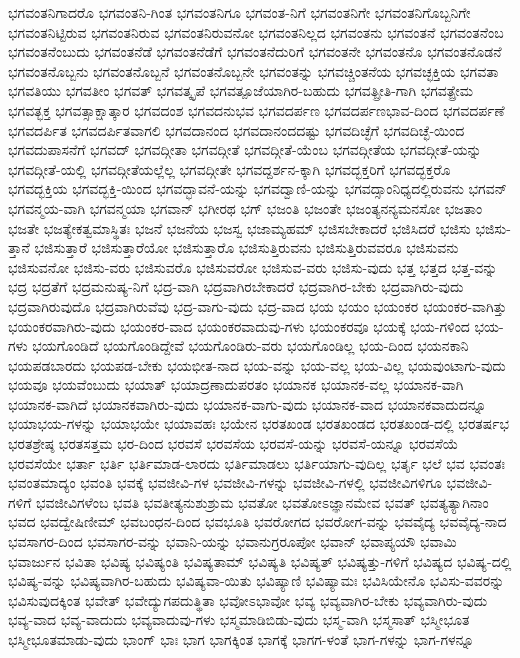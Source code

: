 {ಭಗವಂತನಿಗಾದರೊ
ಭಗವಂತನಿ-ಗಿಂತ
ಭಗವಂತನಿಗೂ
ಭಗವಂತ-ನಿಗೆ
ಭಗವಂತನಿಗೇ
ಭಗವಂತನಿಗೊಬ್ಬನಿಗೇ
ಭಗವಂತನಿಟ್ಟಿರುವ
ಭಗವಂತನಿರುವ
ಭಗವಂತನಿರುವನೋ
ಭಗವಂತನಿಲ್ಲದ
ಭಗವಂತನು
ಭಗವಂತನೆ
ಭಗವಂತನೆಂಬ
ಭಗವಂತನೆಂಬುದು
ಭಗವಂತನೆಡೆ
ಭಗವಂತನೆಡೆಗೆ
ಭಗವಂತನೆದುರಿಗೆ
ಭಗವಂತನೇ
ಭಗವಂತನೊ
ಭಗವಂತನೊಡನೆ
ಭಗವಂತನೊಬ್ಬನು
ಭಗವಂತನೊಬ್ಬನೆ
ಭಗವಂತನೊಬ್ಬನೇ
ಭಗವಂತನ್ನು
ಭಗವಚ್ಚಿಂತನೆಯ
ಭಗವಚ್ಛಕ್ತಿಯ
ಭಗವತಾ
ಭಗವತಿಯು
ಭಗವತೀಂ
ಭಗವತ್
ಭಗವತ್ಕೃಪೆ
ಭಗವತ್ಪೂಜೆಯಾಗಿರ-ಬಹುದು
ಭಗವತ್ಪ್ರೀತಿ-ಗಾಗಿ
ಭಗವತ್ಪ್ರೇಮ
ಭಗವತ್ಭಕ್ತ
ಭಗವತ್ಸಾಕ್ಷಾತ್ಕಾರ
ಭಗವದಂಶ
ಭಗವದನುಭವ
ಭಗವದರ್ಪಣ
ಭಗವದರ್ಪಣಭಾವ-ದಿಂದ
ಭಗವದರ್ಪಣೆ
ಭಗವದರ್ಪಿತ
ಭಗವದರ್ಪಿತವಾಗಲಿ
ಭಗವದಾನಂದ
ಭಗವದಾನಂದದಷ್ಟು
ಭಗವದಿಚ್ಛೆಗೆ
ಭಗವದಿಚ್ಛೆ-ಯಿಂದ
ಭಗವದುಪಾಸನೆಗೆ
ಭಗವದ್
ಭಗವದ್ಗೀತಾ
ಭಗವದ್ಗೀತೆ
ಭಗವದ್ಗೀತೆ-ಯೆಂಬ
ಭಗವದ್ಗೀತೆಯ
ಭಗವದ್ಗೀತೆ-ಯನ್ನು
ಭಗವದ್ಗೀತೆ-ಯಲ್ಲಿ
ಭಗವದ್ಗೀತೆಯಲ್ಲೆಲ್ಲ
ಭಗವದ್ಗೀತೇ
ಭಗವದ್ದರ್ಶನ-ಕ್ಕಾಗಿ
ಭಗವದ್ಭಕ್ತರಿಗೆ
ಭಗವದ್ಭಕ್ತರೊ
ಭಗವದ್ಭಕ್ತಿಯ
ಭಗವದ್ಭಕ್ತಿ-ಯಿಂದ
ಭಗವದ್ಭಾವನೆ-ಯನ್ನು
ಭಗವದ್ವಾಣಿ-ಯನ್ನು
ಭಗವದ್ಸಾಂನಿಧ್ಯದಲ್ಲಿರುವನು
ಭಗವನ್
ಭಗವನ್ಮಯ-ವಾಗಿ
ಭಗವನ್ಮಯಾ
ಭಗವಾನ್
ಭಗೀರಥ
ಭಗ್
ಭಜಂತಿ
ಭಜಂತೇ
ಭಜಂತ್ಯನನ್ಯಮನಸೋ
ಭಜತಾಂ
ಭಜತೇ
ಭಜತ್ಯೇಕತ್ವಮಾಸ್ಥಿತಃ
ಭಜನೆ
ಭಜನೆಯ
ಭಜಸ್ವ
ಭಜಾಮ್ಯಹಮ್
ಭಜಿಸಬೇಕಾದರೆ
ಭಜಿಸಿದರೆ
ಭಜಿಸು
ಭಜಿಸು-ತ್ತಾನೆ
ಭಜಿಸುತ್ತಾರೆ
ಭಜಿಸುತ್ತಾರೆಯೋ
ಭಜಿಸುತ್ತಾರೊ
ಭಜಿಸುತ್ತಿರುವನು
ಭಜಿಸುತ್ತಿರುವವರೂ
ಭಜಿಸುವನು
ಭಜಿಸುವನೋ
ಭಜಿಸು-ವರು
ಭಜಿಸುವರೊ
ಭಜಿಸುವರೋ
ಭಜಿಸುವ-ವರು
ಭಜಿಸು-ವುದು
ಭತ್ತ
ಭತ್ತದ
ಭತ್ತ-ವನ್ನು
ಭದ್ರ
ಭದ್ರತೆಗೆ
ಭದ್ರಮನುಷ್ಯ-ನಿಗೆ
ಭದ್ರ-ವಾಗಿ
ಭದ್ರವಾಗಿರಬೇಕಾದರೆ
ಭದ್ರವಾಗಿರ-ಬೇಕು
ಭದ್ರವಾಗಿರು-ವುದು
ಭದ್ರವಾಗಿರುವುದೊ
ಭದ್ರವಾಗಿರುವೆವು
ಭದ್ರ-ವಾಗು-ವುದು
ಭದ್ರ-ವಾದ
ಭಯ
ಭಯಂ
ಭಯಂಕರ
ಭಯಂಕರ-ವಾಗಿತ್ತು
ಭಯಂಕರವಾಗಿರು-ವುದು
ಭಯಂಕರ-ವಾದ
ಭಯಂಕರವಾದುವು-ಗಳು
ಭಯಂಕರವೂ
ಭಯಕ್ಕೆ
ಭಯ-ಗಳಿಂದ
ಭಯ-ಗಳು
ಭಯಗೊಂಡಿದೆ
ಭಯಗೊಂಡಿದ್ದೇವೆ
ಭಯಗೊಂಡಿರು-ವರು
ಭಯಗೊಂಡಿಲ್ಲ
ಭಯ-ದಿಂದ
ಭಯನಕಾನಿ
ಭಯಪಡಬಾರದು
ಭಯಪಡ-ಬೇಕು
ಭಯಭೀತ-ನಾದ
ಭಯ-ವನ್ನು
ಭಯ-ವಲ್ಲ
ಭಯ-ವಿಲ್ಲ
ಭಯವುಂಟಾಗು-ವುದು
ಭಯವೂ
ಭಯವೆಂಬುದು
ಭಯಾತ್
ಭಯಾದ್ರಣಾದುಪರತಂ
ಭಯಾನಕ
ಭಯಾನಕ-ವಲ್ಲ
ಭಯಾನಕ-ವಾಗಿ
ಭಯಾನಕ-ವಾಗಿದೆ
ಭಯಾನಕವಾಗಿರು-ವುದು
ಭಯಾನಕ-ವಾಗು-ವುದು
ಭಯಾನಕ-ವಾದ
ಭಯಾನಕವಾದುದನ್ನೂ
ಭಯಾಭಯ-ಗಳನ್ನು
ಭಯಾಭಯೇ
ಭಯಾವಹಃ
ಭಯೇನ
ಭರತಖಂಡ
ಭರತಖಂಡದ
ಭರತಖಂಡ-ದಲ್ಲಿ
ಭರತರ್ಷಭ
ಭರತಶ್ರೇಷ್ಠ
ಭರತಸತ್ತಮ
ಭರ-ದಿಂದ
ಭರವಸೆ
ಭರವಸೆಯ
ಭರವಸೆ-ಯನ್ನು
ಭರವಸೆ-ಯನ್ನೂ
ಭರವಸೆಯೆ
ಭರವಸೆಯೇ
ಭರ್ತಾ
ಭರ್ತಿ
ಭರ್ತಿಮಾಡ-ಲಾರದು
ಭರ್ತಿಮಾಡಲು
ಭರ್ತಿಯಾಗು-ವುದಿಲ್ಲ
ಭರ್ತೃ
ಭಲೆ
ಭವ
ಭವಂತಃ
ಭವಂತಮಾದ್ಯಂ
ಭವಂತಿ
ಭವಕ್ಕೆ
ಭವಜೀವಿ-ಗಳ
ಭವಜೀವಿ-ಗಳನ್ನು
ಭವಜೀವಿ-ಗಳಲ್ಲಿ
ಭವಜೀವಿಗಳಿಗೂ
ಭವಜೀವಿ-ಗಳಿಗೆ
ಭವಜೀವಿಗಳೆಂಬ
ಭವತಿ
ಭವತೀತ್ಯನುಶುಶ್ರುಮ
ಭವತೋ
ಭವತೋಽಜ್ಞಾನಮೇವ
ಭವತ್
ಭವತ್ಯತ್ಯಾಗಿನಾಂ
ಭವದ
ಭವದ್ವೇಷಿಣೀಮ್
ಭವಬಂಧನ-ದಿಂದ
ಭವಭೂತಿ
ಭವರೋಗದ
ಭವರೋಗ-ವನ್ನು
ಭವವೈದ್ಯ
ಭವವೈದ್ಯ-ನಾದ
ಭವಸಾಗರ-ದಿಂದ
ಭವಸಾಗರ-ವನ್ನು
ಭವಾನಿ-ಯನ್ನು
ಭವಾನುಗ್ರರೂಪೋ
ಭವಾನ್
ಭವಾಪ್ಯಯೌ
ಭವಾಮಿ
ಭವಾರ್ಜುನ
ಭವಿತಾ
ಭವಿಷ್ಯ
ಭವಿಷ್ಯಂತಿ
ಭವಿಷ್ಯತಾಮ್
ಭವಿಷ್ಯತಿ
ಭವಿಷ್ಯತ್
ಭವಿಷ್ಯತ್ತು-ಗಳಿಗೆ
ಭವಿಷ್ಯದ
ಭವಿಷ್ಯ-ದಲ್ಲಿ
ಭವಿಷ್ಯ-ವನ್ನು
ಭವಿಷ್ಯವಾಗಿರ-ಬಹುದು
ಭವಿಷ್ಯವಾ-ಯಿತು
ಭವಿಷ್ಯಾಣಿ
ಭವಿಷ್ಯಾಮಃ
ಭವಿಸಿಯೇನೊ
ಭವಿಸು-ವವರನ್ನು
ಭವಿಸುವುದಕ್ಕಿಂತ
ಭವೇತ್
ಭವೇದ್ಯುಗಪದುತ್ಥಿತಾ
ಭವೋಽಭಾವೋ
ಭವ್ಯ
ಭವ್ಯವಾಗಿರ-ಬೇಕು
ಭವ್ಯವಾಗಿರು-ವುದು
ಭವ್ಯ-ವಾದ
ಭವ್ಯ-ವಾದುದು
ಭವ್ಯವಾದುವು-ಗಳು
ಭಸ್ಮಮಾಡಿಬಿಡು-ವುದು
ಭಸ್ಮ-ವಾಗಿ
ಭಸ್ಮಸಾತ್
ಭಸ್ಮೀಭೂತ
ಭಸ್ಮೀಭೂತಮಾಡು-ವುದು
ಭಾಂಗ್
ಭಾಃ
ಭಾಗ
ಭಾಗಕ್ಕಿಂತ
ಭಾಗಕ್ಕೆ
ಭಾಗಗ-ಳಂತೆ
ಭಾಗ-ಗಳನ್ನು
ಭಾಗ-ಗಳನ್ನೂ
}
